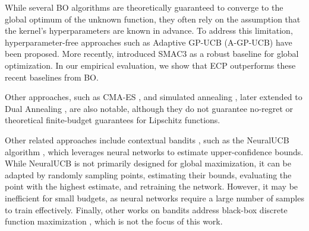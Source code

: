 While several BO algorithms are theoretically guaranteed to converge to the global optimum of the unknown function, they often rely on the assumption that the kernel's hyperparameters are known in advance. To address this limitation, hyperparameter-free approaches such as Adaptive GP-UCB (A-GP-UCB) \citep{JMLR:v20:18-213} have been proposed. More recently, \citet{JMLR:v23:21-0888} introduced SMAC3 as a robust baseline for global optimization. In our empirical evaluation, we show that ECP outperforms these recent baselines from BO.


Other approaches, such as CMA-ES \citep{hansen1996adapting, hansen2006cma, hansen2019pycma}, and simulated annealing \citep{metropolis1953equation, kirkpatrick1983optimization}, later extended to Dual Annealing \citep{xiang1997generalized, tsallis1988possible, tsallis1996generalized}, are also notable, although they do not guarantee no-regret \citep{malherbe2017global} or theoretical finite-budget guarantees for Lipschitz functions.

Other related approaches include contextual bandits \citep{auer2002using, langford2007epoch, filippi2010parametric, valko2013finite, lattimore2020bandit}, such as the NeuralUCB algorithm \citep{zhou2020neural}, which leverages neural networks to estimate upper-confidence bounds. While NeuralUCB is not primarily designed for global maximization, it can be adapted by randomly sampling points, estimating their bounds, evaluating the point with the highest estimate, and retraining the network. However, it may be inefficient for small budgets, as neural networks require a large number of samples to train effectively. Finally, other works on bandits address black-box discrete function maximization \citep{fourati2023randomized, fourati2024combinatorial, pmlr-v235-fourati24b}, which is not the focus of this work.